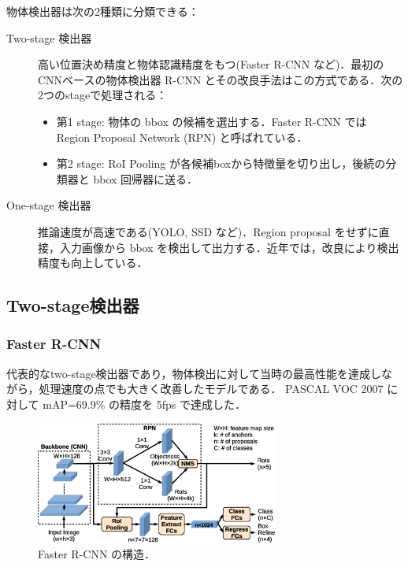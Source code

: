 \documentclass[originalpaper]{jsaiart}     %
\begin{document}
物体検出器は次の2種類に分類できる\cite{JZLYLFQ19}：
\begin{description}
    \item[Two-stage 検出器] 高い位置決め精度と物体認識精度をもつ(Faster R-CNN など)．最初のCNNベースの物体検出器 R-CNN とその改良手法はこの方式である．次の2つのstageで処理される：
    \begin{itemize}
        \item 第1 stage: 物体の bbox の候補を選出する．Faster R-CNN では Region Proposal Network (RPN) と呼ばれている．
        \item 第2 stage: RoI Pooling が各候補boxから特徴量を切り出し，後続の分類器と bbox 回帰器に送る．
    \end{itemize}
    \item[One-stage 検出器] 推論速度が高速である(YOLO, SSD など)．Region proposal をせずに直接，入力画像から bbox を検出して出力する．近年では，改良により検出精度も向上している．
\end{description}

\subsection{Two-stage検出器}
\subsubsection{Faster R-CNN}
代表的なtwo-stage検出器であり，物体検出に対して当時の最高性能を達成しながら，処理速度の点でも大きく改善したモデルである\cite{RHGS15}．
PASCAL VOC 2007 に対して mAP=69.9\% の精度を 5fps で達成した．
\begin{figure}[tb]
    \begin{center}
        \includegraphics[width=8cm,clip]{fig/archi_FasterRCNN.eps}
    \end{center}
    \caption{ Faster R-CNN の構造．}
    \label{fig:archi_FasterRCNN}
\end{figure}
\end{document}
